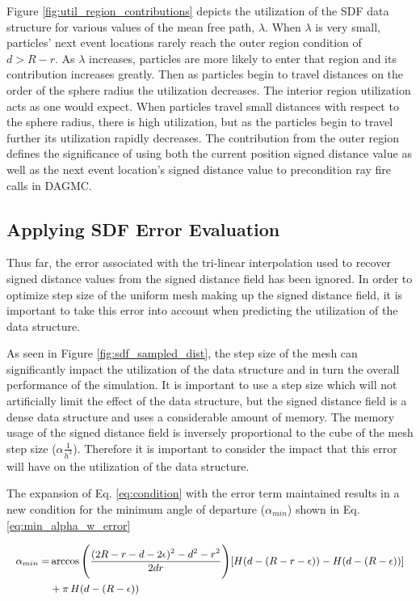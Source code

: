 Figure \ref{fig:util_region_contributions} depicts the utilization of the SDF
data structure for various values of the mean free path, $\lambda$.
When $\lambda$ is very small, particles' next event locations
rarely reach the outer region condition of $ d > R - r $. As $\lambda$ increases, particles are
more likely to enter that region and its contribution increases greatly. Then
as particles begin to travel distances on the order of the sphere radius the
utilization decreases. The interior region utilization acts as one would
expect. When particles travel small distances with respect to the sphere radius,
there is high utilization, but as the particles begin to travel further its
utilization rapidly decreases. The contribution from the outer region defines the
significance of using both the current position signed distance value as well as the
next event location's signed distance value to precondition ray fire calls in DAGMC.

\subsection{Applying SDF Error Evaluation}

Thus far, the error associated with the tri-linear interpolation used to recover
signed distance values from the signed distance field has been ignored. In
order to optimize step size of the uniform mesh making up the signed distance
field, it is important to take this error into account when predicting the
utilization of the data structure.

As seen in Figure \ref{fig:sdf_sampled_dist}, the step size of the mesh can
significantly impact the utilization of the data structure and in turn the
overall performance of the simulation. It is important to use a step size which
will not artificially limit the effect of the data structure, but the signed
distance field is a dense data structure and uses a considerable amount of
memory. The memory usage of the signed distance field is inversely proportional
to the cube of the mesh step size ($\alpha \frac{1}{h^{3}}$). Therefore it is
important to consider the impact that this error will have on the utilization
of the data structure.

The expansion of Eq. \ref{eq:condition} with the error term maintained results in
a new condition for the minimum angle of departure ($\alpha_{min}$) shown in
Eq. \ref{eq:min_alpha_w_error}

\begin{equation}
\small
\begin{split}
\alpha_{min} =& \arccos\Bigg ( \frac{(2R-r-d-2\epsilon)^2-d^2-r^2}{2 d r} \Bigg )[H(d-(R-r-\epsilon))-H(d-(R-\epsilon))]  \\
&+ \pi \, H(d-(R-\epsilon))
\end{split}
\label{eq:min_alpha_w_error}
\end{equation}

